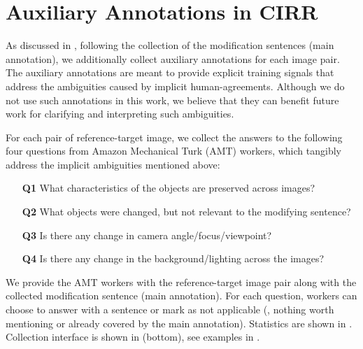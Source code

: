 \documentclass[10pt,twocolumn,letterpaper]{article}
\makeatletter
\renewcommand{\paragraph}{\@startsection{paragraph}{4}{\z@}{1.05ex \@plus 1ex \@minus .2ex}{-1em}{\normalfont\normalsize\bfseries}}
\newcommand{\dstname}{CIRR\xspace}
\makeatother
\begin{document}
\section{Auxiliary Annotations in \dstname} \label{sec:aux_anno}
As discussed in , following the collection of the modification sentences (main annotation), we additionally collect auxiliary annotations for each image pair. 
The auxiliary annotations are meant to provide explicit training signals that address the ambiguities caused by implicit human-agreements. 
Although we do not use such annotations in this work, we believe that they can benefit future work for clarifying and interpreting such ambiguities.

\paragraph{Collection.}
For each pair of reference-target image, we collect the answers to the following four questions from Amazon Mechanical Turk (AMT) workers, which tangibly address the implicit ambiguities mentioned above:
\begin{itemize}
  \denselist
  \item[\bf Q1] What characteristics of the objects are preserved across images?
  \item[\bf Q2] What objects were changed, but not relevant to the modifying sentence?
  \item[\bf Q3] Is there any change in camera angle/focus/viewpoint?
  \item[\bf Q4] Is there any change in the background/lighting across the images?
\end{itemize}

We provide the AMT workers with the reference-target image pair along with the collected modification sentence (main annotation).
For each question, workers can choose to answer with a sentence or mark as not applicable (\eg, nothing worth mentioning or already covered by the main annotation).
Statistics are shown in . Collection interface is shown in  (bottom), see examples in .
\end{document}
